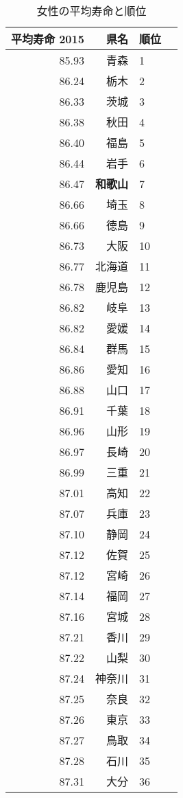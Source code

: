 \begin{table}[ht]
\caption{女性の平均寿命と順位}
\centering
\scriptsize
\begin{tabular}{rrlr}
  \hline
  平均寿命 2015 & 県名 & 順位 \\
  \hline
85.93 & 青森 &   1 \\
 86.24 & 栃木 &   2 \\
 86.33 & 茨城 &   3 \\
 86.38 & 秋田 &   4 \\
 86.40 & 福島 &   5 \\
 86.44 & 岩手 &   6 \\
 86.47 & \textbf{和歌山} &   7 \\
 86.66 & 埼玉 &   8 \\
 86.66 & 徳島 &   9 \\
 86.73 & 大阪 &  10 \\
 86.77 & 北海道 &  11 \\
 86.78 & 鹿児島 &  12 \\
 86.82 & 岐阜 &  13 \\
 86.82 & 愛媛 &  14 \\
 86.84 & 群馬 &  15 \\
 86.86 & 愛知 &  16 \\
 86.88 & 山口 &  17 \\
 86.91 & 千葉 &  18 \\
 86.96 & 山形 &  19 \\
 86.97 & 長崎 &  20 \\
 86.99 & 三重 &  21 \\
 87.01 & 高知 &  22 \\
 87.07 & 兵庫 &  23 \\
 87.10 & 静岡 &  24 \\
 87.12 & 佐賀 &  25 \\
 87.12 & 宮崎 &  26 \\
 87.14 & 福岡 &  27 \\
 87.16 & 宮城 &  28 \\
 87.21 & 香川 &  29 \\
 87.22 & 山梨 &  30 \\
 87.24 & 神奈川 &  31 \\
 87.25 & 奈良 &  32 \\
 87.26 & 東京 &  33 \\
 87.27 & 鳥取 &  34 \\
 87.28 & 石川 &  35 \\
 87.31 & 大分 &  36 \\

\end{tabular}
\end{table}
